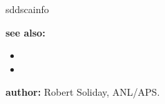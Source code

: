 \begin{sddsprog}{sddscainfo}
\item \textbf{see also:}
\begin{itemize}
  \item {}
  \item {}
\end{itemize}

\item \textbf{author:} Robert Soliday, ANL/APS.
\end{sddsprog}

